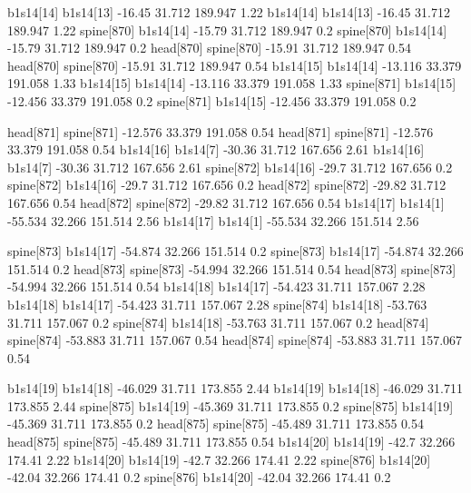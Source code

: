 b1s14[14]    b1s14[13]    -16.45    31.712    189.947    1.22
b1s14[14]    b1s14[13]    -16.45    31.712    189.947    1.22
spine[870]    b1s14[14]    -15.79    31.712    189.947    0.2
spine[870]    b1s14[14]    -15.79    31.712    189.947    0.2
head[870]    spine[870]    -15.91    31.712    189.947    0.54
head[870]    spine[870]    -15.91    31.712    189.947    0.54
b1s14[15]    b1s14[14]    -13.116    33.379    191.058    1.33
b1s14[15]    b1s14[14]    -13.116    33.379    191.058    1.33
spine[871]    b1s14[15]    -12.456    33.379    191.058    0.2
spine[871]    b1s14[15]    -12.456    33.379    191.058    0.2


head[871]    spine[871]    -12.576    33.379    191.058    0.54
head[871]    spine[871]    -12.576    33.379    191.058    0.54
b1s14[16]    b1s14[7]    -30.36    31.712    167.656    2.61
b1s14[16]    b1s14[7]    -30.36    31.712    167.656    2.61
spine[872]    b1s14[16]    -29.7    31.712    167.656    0.2
spine[872]    b1s14[16]    -29.7    31.712    167.656    0.2
head[872]    spine[872]    -29.82    31.712    167.656    0.54
head[872]    spine[872]    -29.82    31.712    167.656    0.54
b1s14[17]    b1s14[1]    -55.534    32.266    151.514    2.56
b1s14[17]    b1s14[1]    -55.534    32.266    151.514    2.56


spine[873]    b1s14[17]    -54.874    32.266    151.514    0.2
spine[873]    b1s14[17]    -54.874    32.266    151.514    0.2
head[873]    spine[873]    -54.994    32.266    151.514    0.54
head[873]    spine[873]    -54.994    32.266    151.514    0.54
b1s14[18]    b1s14[17]    -54.423    31.711    157.067    2.28
b1s14[18]    b1s14[17]    -54.423    31.711    157.067    2.28
spine[874]    b1s14[18]    -53.763    31.711    157.067    0.2
spine[874]    b1s14[18]    -53.763    31.711    157.067    0.2
head[874]    spine[874]    -53.883    31.711    157.067    0.54
head[874]    spine[874]    -53.883    31.711    157.067    0.54


b1s14[19]    b1s14[18]    -46.029    31.711    173.855    2.44
b1s14[19]    b1s14[18]    -46.029    31.711    173.855    2.44
spine[875]    b1s14[19]    -45.369    31.711    173.855    0.2
spine[875]    b1s14[19]    -45.369    31.711    173.855    0.2
head[875]    spine[875]    -45.489    31.711    173.855    0.54
head[875]    spine[875]    -45.489    31.711    173.855    0.54
b1s14[20]    b1s14[19]    -42.7    32.266    174.41    2.22
b1s14[20]    b1s14[19]    -42.7    32.266    174.41    2.22
spine[876]    b1s14[20]    -42.04    32.266    174.41    0.2
spine[876]    b1s14[20]    -42.04    32.266    174.41    0.2


